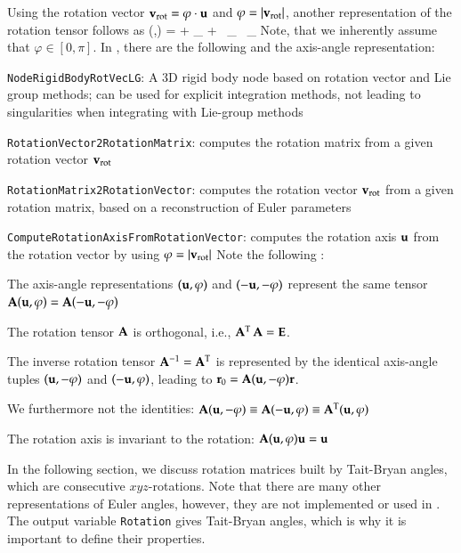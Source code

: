{%
%
Using the rotation vector $\mathbf{v}_\mathrm{rot} = \varphi\cdot \mathbf{u}$ and $\varphi = |\mathbf{v}_\mathrm{rot}|$, another representation of the rotation tensor follows as
\be 
  \Rot(\uv ,\varphi) =  \Im + \frac{\sin \varphi}{\varphi} \tilde\vv_ +  \,  \tilde\vv_ \, \tilde\vv_
\ee
Note, that we inherently assume that $\varphi \in [0,\pi]$.
%
\noindent In \codeName, there are the following  and the axis-angle representation:
\bi
  \item \texttt{NodeRigidBodyRotVecLG}: A 3D rigid body node based on rotation vector and Lie group methods; can be used for explicit integration methods, not leading to singularities when integrating with Lie-group methods
  \item \texttt{RotationVector2RotationMatrix}: computes the rotation matrix from a given rotation vector $\mathbf{v}_\mathrm{rot}$
  \item \texttt{RotationMatrix2RotationVector}: computes the rotation vector $\mathbf{v}_\mathrm{rot}$ from a given rotation matrix, based on a reconstruction of Euler parameters
  \item \texttt{ComputeRotationAxisFromRotationVector}: computes the rotation axis $\mathbf{u}$ from the rotation vector by using $\varphi = |\mathbf{v}_\mathrm{rot}|$
\ei
%
Note the following :
\bi
  \item The axis-angle representations $(\mathbf{u}, \varphi)$ and $(-\mathbf{u}, -\varphi)$ represent the same tensor $\mathbf{A}(\mathbf{u},\varphi)=\mathbf{A}(-\mathbf{u},-\varphi)$
  \item The rotation tensor $\mathbf{A}$ is orthogonal, i.e., $\mathbf{A}^\mathrm{T} \, \mathbf{A} = \mathbf{E}$. 
  \item The inverse rotation tensor $\mathbf{A}^{-1} = \mathbf{A}^\mathrm{T}$ is represented by the identical axis-angle tuples $(\mathbf{u}, -\varphi)$ and $(-\mathbf{u}, \varphi)$, leading to $\mathbf{r}_0=\mathbf{A}(\mathbf{u}, -\varphi) \mathbf{r}$.
  \item We furthermore not the identities: $\mathbf{A}(\mathbf{u}, -\varphi) \equiv \mathbf{A}(-\mathbf{u}, \varphi) \equiv \mathbf{A}^\mathrm{T} (\mathbf{u}, \varphi)$
  \item The rotation axis is invariant to the rotation: $\mathbf{A}(\mathbf{u}, \varphi) \mathbf{u} = \mathbf{u}$
\ei
}

In the following section, we discuss rotation matrices built by Tait-Bryan angles, which are consecutive $xyz$-rotations.
Note that there are many other representations of Euler angles, however, they are not implemented or used in \codeName.
The output variable \texttt{Rotation} gives Tait-Bryan angles, which is why it is important to define their properties.

